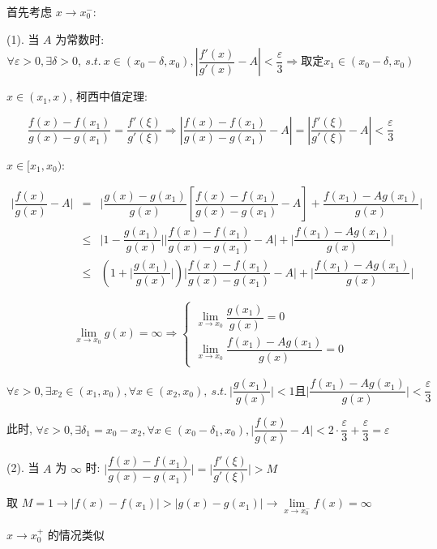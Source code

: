 \begin{anymark}[证明]
	首先考虑 $x\to x_{0}^{-}$:

	(1). 当 $A$ 为常数时:
	$$\forall \varepsilon > 0, \exists \delta > 0,\ s.t.\ x\in (x_{0}-\delta,x_{0}), |\dfrac{f'(x)}{g'(x)}-A|<\dfrac{\varepsilon}{3}\Rightarrow \text{取定} x_{1}\in (x_{0}-\delta,x_{0})$$

	$x\in (x_{1},x)$, 柯西中值定理:

	$$\dfrac{f(x)-f(x_{1})}{g(x)-g(x_{1})} = \dfrac{f'(\xi)}{g'(\xi)}\Rightarrow |\dfrac{f(x)-f(x_{1})}{g(x)-g(x_{1})}-A| = |\dfrac{f'(\xi)}{g'(\xi)}-A| < \dfrac{\varepsilon}{3}$$

	$x\in[x_{1},x_{0})$:

	\begin{eqnarray*}
		\big|\dfrac{f(x)}{g(x)} -A\big| &=& \big|\dfrac{g(x)-g(x_{1})}{g(x)} \left[\dfrac{f(x)-f(x_{1})}{g(x)-g(x_{1})}-A\right] + \dfrac{f(x_{1})-Ag(x_{1})}{g(x)}\big|\\
								&\leq& \big|1-\dfrac{g(x_{1})}{g(x)}\big|\big|\dfrac{f(x)-f(x_{1})}{g(x)-g(x_{1})}-A\big|+\big|\dfrac{f(x_{1})-Ag(x_{1})}{g(x)}\big|\\
								&\leq& (1+\big|\dfrac{g(x_{1})}{g(x)}\big|)\big|\dfrac{f(x)-f(x_{1})}{g(x)-g(x_{1})}-A\big|+\big|\dfrac{f(x_{1})-Ag(x_{1})}{g(x)}\big|
	\end{eqnarray*}

	$$\lim\limits_{x\to x_{0}}g(x) =\infty\Rightarrow 
	\begin{cases} 
		\lim\limits_{x\to x_{0}}\dfrac{g(x_{1})}{g(x)} =0 \\
		\lim\limits_{x\to x_{0}}\dfrac{f(x_{1})-Ag(x_{1})}{g(x)}=0
	\end{cases}$$

	
	$$\forall \varepsilon >0, \exists x_{2}\in(x_{1},x_{0}),\forall x\in(x_{2},x_{0}),\ s.t.\ \big|\dfrac{g(x_{1})}{g(x)}\big|< 1 \text{且}
	\big|\dfrac{f(x_{1})-Ag(x_{1})}{g(x)}\big|< \dfrac{\varepsilon}{3}$$

	此时, $\forall \varepsilon > 0, \exists \delta_{1} = x_{0}-x_{2}, \forall x\in (x_{0}-\delta_{1},x_{0}), \big|\dfrac{f(x)}{g(x)} -A\big|<2\cdot \dfrac{\varepsilon}{3}+\dfrac{\varepsilon}{3}=\varepsilon$
	
	(2). 当 $A$ 为 $\infty$ 时: $\big|\dfrac{f(x)-f(x_{1})}{g(x)-g(x_{1})}\big| = \big|\dfrac{f'(\xi)}{g'(\xi)}\big| > M$
	
	取 $M = 1\to \big|f(x)-f(x_{1})\big| > \big|g(x)-g(x_{1})\big|\to \lim\limits_{x\to x_{0}^{-}}f(x) = \infty$

	$x\to x_{0}^{+}$ 的情况类似
\end{anymark}

